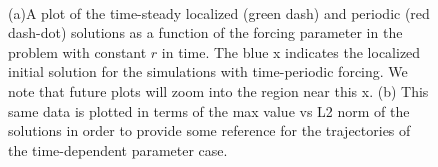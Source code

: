\documentclass[pre,preprint,superscriptaddress]{revtex4-1}
\begin{document}
\begin{figure}[!htb]
  \begin{center}
    \mbox{
       \quad
      }
    \caption{(a)A plot of the time-steady localized (green dash) and periodic (red dash-dot) solutions as a function of the forcing parameter in the problem with constant $r$ in time.  The blue x indicates the localized initial solution for the simulations with time-periodic forcing.  We note that future plots will zoom into the region near this x.  (b) This same data is plotted in terms of the max value vs L2 norm of the solutions in order to provide some reference for the trajectories of the time-dependent parameter case. }
    \label{fig:NormMaxBack}
  \end{center}
\end{figure} 
\end{document}
